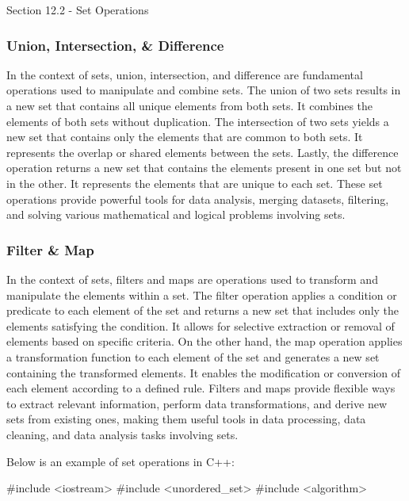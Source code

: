 \begin{notes}{Section 12.2 - Set Operations}
    \subsubsection*{Union, Intersection, \& Difference}

    In the context of sets, union, intersection, and difference are fundamental operations used to manipulate and combine sets. The union of two sets results in a new set that contains all unique elements from both sets. It combines the elements of both sets without duplication. The intersection of two sets yields a new set that contains only the 
    elements that are common to both sets. It represents the overlap or shared elements between the sets. Lastly, the difference operation returns a new set that contains the elements present in one set but not in the other. It represents the elements that are unique to each set. These set operations provide powerful tools for data analysis, merging 
    datasets, filtering, and solving various mathematical and logical problems involving sets.
    
    \subsubsection*{Filter \& Map}
    
    In the context of sets, filters and maps are operations used to transform and manipulate the elements within a set. The filter operation applies a condition or predicate to each element of the set and returns a new set that includes only the elements satisfying the condition. It allows for selective extraction or removal of elements based on specific 
    criteria. On the other hand, the map operation applies a transformation function to each element of the set and generates a new set containing the transformed elements. It enables the modification or conversion of each element according to a defined rule. Filters and maps provide flexible ways to extract relevant information, perform data transformations, 
    and derive new sets from existing ones, making them useful tools in data processing, data cleaning, and data analysis tasks involving sets.
    
    \begin{highlight}
        Below is an example of set operations in C++:
    
        \begin{code}[C++]
        #include <iostream>
        #include <unordered_set>
        #include <algorithm>
        

\end{code}
\end{highlight}
\end{notes}
